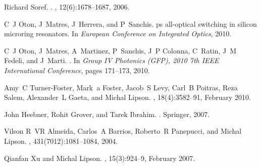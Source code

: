 \documentclass[twocolumn]{el-author}
\begin{document}
\begin{thebibliography}{1}

Richard Soref.
.
,
  12(6):1678--1687, 2006.

C~J Oton, J~Matres, J~Herrera, and P~Sanchis.
 ps all-optical switching in silicon microring resonators.
\newblock In {\em European Conference on Integrated Optics}, 2010.

C~J Oton, J~Matres, A~Martinez, P~Sanchis, J~P Colonna, C~Ratin, J~M Fedeli,
  and J~Marti.
.
\newblock In {\em Group IV Photonics (GFP), 2010 7th IEEE International
  Conference}, pages 171--173, 2010.

Amy~C Turner-Foster, Mark~a Foster, Jacob~S Levy, Carl~B Poitras, Reza Salem,
  Alexander~L Gaeta, and Michal Lipson.
, 18(4):3582--91, February 2010.

John Heebner, Rohit Grover, and Tarek Ibrahim.
.
\newblock Springer, 2007.

Vilson R~VR Almeida, Carlos~A Barrios, Roberto~R Panepucci, and Michal Lipson.
, 431(7012):1081--1084, 2004.

Qianfan Xu and Michal Lipson.
, 15(3):924--9, February 2007.

\end{thebibliography}
\end{document}
